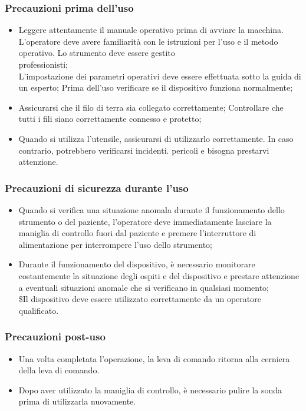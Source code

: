 \documentclass[a4paper]{article}
\begin{document}
\subsubsection{Precauzioni prima dell'uso}
\begin{itemize}
  \item Leggere attentamente il manuale operativo prima di avviare la macchina. L'operatore deve avere familiarità con le istruzioni per l'uso e il metodo operativo. Lo strumento deve essere gestito\\
professionisti;\\
L'impostazione dei parametri operativi deve essere effettuata sotto la guida di un esperto; Prima dell'uso verificare se il dispositivo funziona normalmente;
  \item Assicurarsi che il filo di terra sia collegato correttamente; Controllare che tutti i fili siano correttamente connesso e protetto;
  \item Quando si utilizza l'utensile, assicurarsi di utilizzarlo correttamente. In caso contrario, potrebbero verificarsi incidenti. pericoli e bisogna prestarvi attenzione.
\end{itemize}

\subsubsection{Precauzioni di sicurezza durante l'uso}
\begin{itemize}
  \item Quando si verifica una situazione anomala durante il funzionamento dello strumento o del paziente, l'operatore deve immediatamente lasciare la maniglia di controllo fuori dal paziente e premere l'interruttore di alimentazione per interrompere l'uso dello strumento;
  \item Durante il funzionamento del dispositivo, è necessario monitorare costantemente la situazione degli ospiti e del dispositivo e prestare attenzione a eventuali situazioni anomale che si verificano in qualsiasi momento;\\
\$Il dispositivo deve essere utilizzato correttamente da un operatore qualificato.
\end{itemize}

\subsubsection{Precauzioni post-uso}
\begin{itemize}
  \item Una volta completata l'operazione, la leva di comando ritorna alla cerniera della leva di comando.
  \item Dopo aver utilizzato la maniglia di controllo, è necessario pulire la sonda prima di utilizzarla nuovamente.
\end{itemize}
\end{document}
